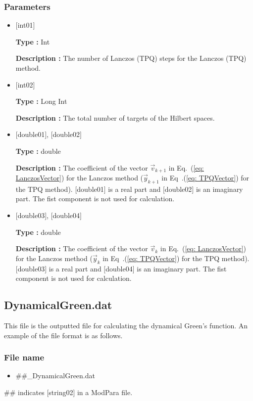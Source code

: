 \subsubsection{Parameters}
 \begin{itemize}

  \item  $[$int01$]$

 {\bf Type :} Int

{\bf Description :}  { The number of Lanczos (TPQ) steps for the Lanczos (TPQ) method.}

  \item  $[$int02$]$

 {\bf Type :} Long Int

{\bf Description :}  The total number of targets of the Hilbert spaces.

 \item  $[$double01$]$, $[$double02$]$ 

 {\bf Type :} double 

{\bf Description :} The coefficient of the vector $\vec{v}_{k+1}$ in Eq.~(\ref{eq: LanczosVector}) for the Lanczos method ($\vec{y}_{k+1}$ in Eq~.(\ref{eq: TPQVector}) for the TPQ method). $[$double01$]$ is a real part and $[$double02$]$ is an imaginary part. The fist component is not used for calculation.

 \item  $[$double03$]$, $[$double04$]$ 

 {\bf Type :} double 

{\bf Description :} The coefficient of the vector $\vec{v}_{k}$ in Eq.~(\ref{eq: LanczosVector}) for the Lanczos method ($\vec{y}_{k}$ in Eq~.(\ref{eq: TPQVector}) for the TPQ method). $[$double03$]$ is a real part and $[$double04$]$ is an imaginary part. The fist component is not used for calculation.\\

 \end{itemize}

\newpage
\subsection{{DynamicalGreen.dat}}
\label{Subsec:dynamicalG}
This file is the outputted file for calculating the dynamical Green's function. An example of the file format is as follows.

\subsubsection{File name}
\begin{itemize}
   \item{\#\#\_DynamicalGreen.dat}
\end{itemize}
\#\# indicates [string02] in a ModPara file.
  
